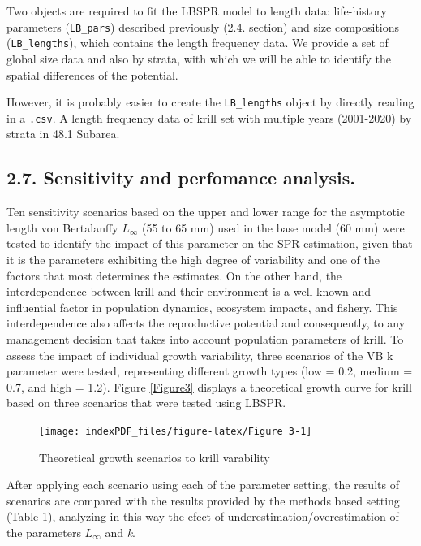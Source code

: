\documentclass[
]{article}
\begin{document}
Two objects are required to fit the LBSPR model to length data:
life-history parameters (\texttt{LB\_pars}) described previously (2.4.
section) and size compositions (\texttt{LB\_lengths}), which contains
the length frequency data. We provide a set of global size data and also
by strata, with which we will be able to identify the spatial
differences of the potential.

However, it is probably easier to create the \texttt{LB\_lengths} object
by directly reading in a \texttt{.csv}. A length frequency data of krill
set with multiple years (2001-2020) by strata in 48.1 Subarea.

\hypertarget{sensitivity-and-perfomance-analysis.}{%
\subsection{2.7. Sensitivity and perfomance
analysis.}\label{sensitivity-and-perfomance-analysis.}}

Ten sensitivity scenarios based on the upper and lower range for the
asymptotic length von Bertalanffy \(L_{\infty}\) (55 to 65 mm) used in
the base model (60 mm) were tested to identify the impact of this
parameter on the SPR estimation, given that it is the parameters
exhibiting the high degree of variability and one of the factors that
most determines the estimates. On the other hand, the interdependence
between krill and their environment is a well-known and influential
factor in population dynamics, ecosystem impacts, and fishery. This
interdependence also affects the reproductive potential and
consequently, to any management decision that takes into account
population parameters of krill. To assess the impact of individual
growth variability, three scenarios of the VB k parameter were tested,
representing different growth types (low = 0.2, medium = 0.7, and high =
1.2). Figure \ref{Figure3} displays a theoretical growth curve for krill
based on three scenarios that were tested using LBSPR.

\begin{figure}[H]

{\centering \texttt{[image: indexPDF\_files/figure-latex/Figure 3-1]} 

}

\caption{\label{Figure3}Theoretical growth scenarios to krill varability}\label{fig:Figure 3}
\end{figure}

After applying each scenario using each of the parameter setting, the
results of scenarios are compared with the results provided by the
methods based setting (Table 1), analyzing in this way the efect of
underestimation/overestimation of the parameters \(L_{\infty}\) and
\emph{k}.
\end{document}
